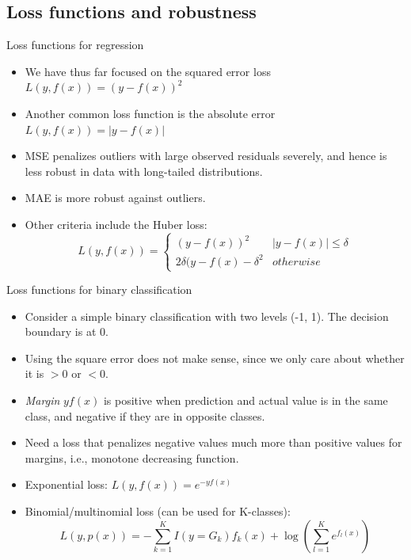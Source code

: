 \documentclass{beamer}
\begin{document}
\subsection{Loss functions and robustness}


\begin{frame}{Loss functions for regression}
    \begin{itemize}
        \item We have thus far focused on the squared error loss $L(y, f(x)) = (y - f(x))^2$
        \item Another common loss function is the absolute error $L(y, f(x)) = |y - f(x)|$
        \item MSE penalizes outliers with large observed residuals severely, and hence is less robust in data with long-tailed distributions.
        \item MAE is more robust against outliers.
        \item Other criteria include the Huber loss:
        \begin{equation*}
            L(y, f(x)) = \left\{ \begin{array}{cc}
                (y - f(x))^2 & |y-f(x)| \leq \delta \\
                2\delta (y-f(x) - \delta^2 & otherwise 
            \end{array}\right.
        \end{equation*}
    \end{itemize}
\end{frame}


\begin{frame}{Loss functions for binary classification}
    \begin{itemize}
        \item Consider a simple binary classification with two levels (-1, 1). The decision boundary is at 0.
        \item Using the square error does not make sense, since we only care about whether it is $>0$ or $<0$.
        \item \textit{Margin} $yf(x)$ is positive when prediction and actual value is in the same class, and negative if they are in opposite classes.
        \item Need a loss that penalizes negative values much more than positive values for margins, i.e., monotone decreasing function.
        \item Exponential loss: $L(y, f(x)) = e^{-yf(x)}$
        \item Binomial/multinomial loss (can be used for K-classes):
        \begin{equation*}
            L(y, p(x)) = -\sum_{k=1}^K I(y=G_k)f_k(x) + \log \left(\sum_{l=1}^K e^{f_l(x)}\right)
        \end{equation*}
    \end{itemize}
\end{frame}
\end{document}
